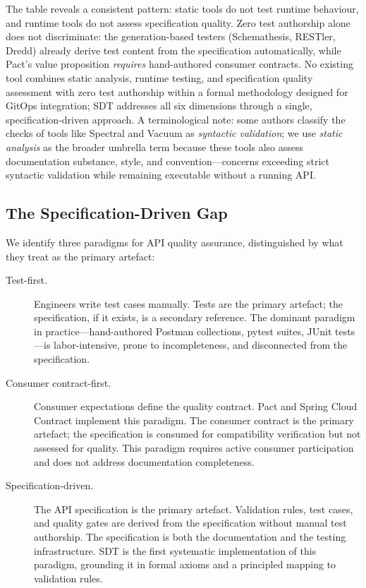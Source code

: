 The table reveals a consistent pattern: static tools do not test runtime behaviour, and runtime tools do not assess specification quality. Zero test authorship alone does not discriminate: the generation-based testers (Schemathesis, RESTler, Dredd) already derive test content from the specification automatically, while Pact's value proposition \emph{requires} hand-authored consumer contracts. No existing tool combines static analysis, runtime testing, and specification quality assessment with zero test authorship within a formal methodology designed for GitOps integration; SDT addresses all six dimensions through a single, specification-driven approach. A terminological note: some authors classify the checks of tools like Spectral and Vacuum as \textit{syntactic validation}; we use \textit{static analysis} as the broader umbrella term because these tools also assess documentation substance, style, and convention---concerns exceeding strict syntactic validation while remaining executable without a running API.

\subsection{The Specification-Driven Gap}
\label{subsec:spec-driven-gap}

We identify three paradigms for API quality assurance, distinguished by what they treat as the primary artefact:

\begin{description}
  \item[Test-first.] Engineers write test cases manually. Tests are the primary artefact; the specification, if it exists, is a secondary reference. The dominant paradigm in practice---hand-authored Postman collections, pytest suites, JUnit tests---is labor-intensive, prone to incompleteness, and disconnected from the specification.

  \item[Consumer contract-first.] Consumer expectations define the quality contract. Pact and Spring Cloud Contract implement this paradigm. The consumer contract is the primary artefact; the specification is consumed for compatibility verification but not assessed for quality. This paradigm requires active consumer participation and does not address documentation completeness.

  \item[Specification-driven.] The API specification is the primary artefact. Validation rules, test cases, and quality gates are derived from the specification without manual test authorship. The specification is both the documentation and the testing infrastructure. SDT is the first systematic implementation of this paradigm, grounding it in formal axioms and a principled mapping to validation rules.
\end{description}


